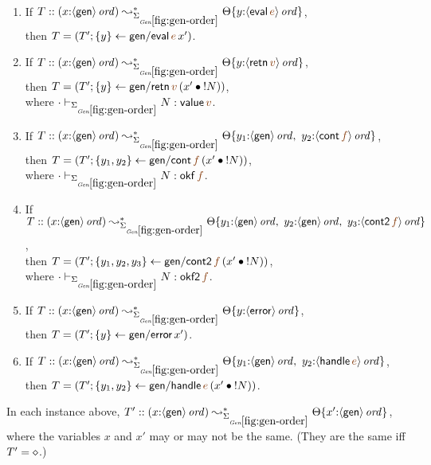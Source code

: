 \bigskip
\begin{lemma}~
\begin{enumerate}
\item If 
   $T :: (x{:}\istrue{\susp{\sf gen}}) \leadsto^*_{\siggenorder}
         \tackon{\Theta}{y{:}\istrue{\susp{{\sf eval}\,\lf{e}}}}$,
\\ then 
   $T = \left(T'; \trstep{y}{{\sf gen/eval}\,\lf{e}\,x'}\right)$.
\medskip
\item If 
   $T :: (x{:}\istrue{\susp{\sf gen}}) \leadsto^*_{\siggenorder}
         \tackon{\Theta}{y{:}\istrue{\susp{{\sf retn}\,\lf{v}}}}$,
\\ then 
   $T = \left(T'; \trstep{y}{{\sf gen/retn}\,\lf{v}\,(\tfuser{x'}{\tbangr{N}})}\right)$,
\\ where 
   $\cdot \vdash_{\siggenorder} N : {{{\sf value}\,\lf{v}}}$.
\medskip
\item If 
   $T :: (x{:}\istrue{\susp{\sf gen}}) \leadsto^*_{\siggenorder}
         \tackon{\Theta}{y_1{:}\istrue{\susp{{\sf gen}}}, ~
                         y_2{:}\istrue{\susp{{\sf cont}\,\lf{f}}}}$,
\\ then 
   $T = \left(T'; \trstep{y_1,y_2}{{\sf gen/cont}\,\lf{f}\,(\tfuser{x'}{\tbangr{N}})}\right)$,
\\ where 
   $\cdot \vdash_{\siggenorder} N : {{{\sf okf}\,\lf{f}}}$.
\medskip
\item If
   $T :: (x{:}\istrue{\susp{\sf gen}}) \leadsto^*_{\siggenorder}
         \tackon{\Theta}{y_1{:}\istrue{\susp{{\sf gen}}}, ~
                         y_2{:}\istrue{\susp{{\sf gen}}}, ~
                         y_3{:}\istrue{\susp{{\sf cont2}\,\lf{f}}}}$,
\\ then 
   $T = \left(T'; \trstep{y_1,y_2,y_3}{{\sf gen/cont2}\,\lf{f}\,(\tfuser{x'}{\tbangr{N}})}\right)$,
\\ where 
   $\cdot \vdash_{\siggenorder} N : {{{\sf okf2}\,\lf{f}}}$.
\medskip
\item If 
   $T :: (x{:}\istrue{\susp{\sf gen}}) \leadsto^*_{\siggenorder}
         \tackon{\Theta}{y{:}\istrue{\susp{{\sf error}}}}$,
\\ then 
   $T = \left(T'; \{{y}\} \leftarrow {{\sf gen/error}\,x'}\right)$.
\medskip
\item If 
   $T :: (x{:}\istrue{\susp{\sf gen}}) \leadsto^*_{\siggenorder}
         \tackon{\Theta}{y_1{:}\istrue{\susp{{\sf gen}}}, ~
                         y_2{:}\istrue{\susp{{\sf handle}\,\lf{e}}}}$,
\\ then 
   $T = \left(T'; \trstep{y_1,y_2}{{\sf gen/handle}\,\lf{e}\,(\tfuser{x'}{\tbangr{N}})}\right)$.
\medskip
\end{enumerate}
In each instance above, 
$T' :: (x{:}\istrue{\susp{\sf gen}}) \leadsto^*_{\siggenorder}
          \tackon{\Theta}{x'{:}\istrue{\susp{{\sf gen}}}}$,
where the variables $x$ and $x'$ may or may not
be the same. (They are the same iff $T' = \diamond$.)
\end{lemma}

